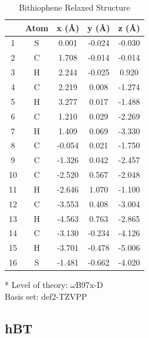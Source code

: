 \begin{table}[hbt!]\centering
\caption{Bithiophene Relaxed Structure}
\renewcommand{\arraystretch}{1.5}
\begin{threeparttable}
\begin{tabular}{ccccc}\toprule
{} & {Atom} & {x (\AA)} & {y (\AA)} & {z (\AA)} \\ \midrule
    1 & S & 0.001 & -0.024 & -0.030\\
    2 & C & 1.708 & -0.014 & -0.014\\
    3 & H & 2.244 & -0.025 & 0.920\\
    4 & C & 2.219 & 0.008 & -1.274\\
    5 & H & 3.277 & 0.017 & -1.488\\
    6 & C & 1.210 & 0.029 & -2.269\\
    7 & H & 1.409 & 0.069 & -3.330\\
    8 & C & -0.054 & 0.021 & -1.750\\
    9 & C & -1.326 & 0.042 & -2.457\\
    10 & C & -2.520 & 0.567 & -2.048\\
    11 & H & -2.646 & 1.070 & -1.100\\
    12 & C & -3.553 & 0.408 & -3.004\\
    13 & H & -4.563 & 0.763 & -2.865\\
    14 & C & -3.130 & -0.234 & -4.126\\
    15 & H & -3.701 & -0.478 & -5.006\\
    16 & S & -1.481 & -0.662 & -4.020\\ \bottomrule
\end{tabular}
\begin{tablenotes}
\item[*] \footnotesize Level of theory: $\omega$B97x-D \\ Basis set: def2-TZVPP
\end{tablenotes}
\end{threeparttable}
\end{table}

\clearpage
\subsection{hBT}

